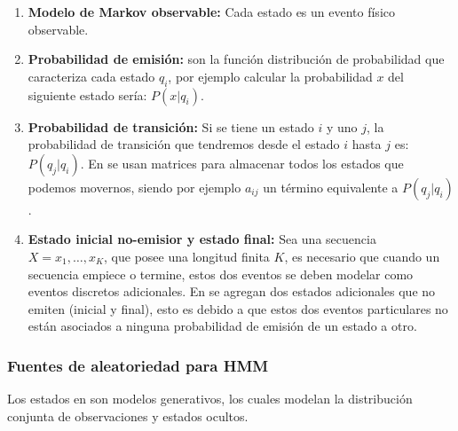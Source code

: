 \begin{enumerate}

	\item \textbf{Modelo de Markov observable:} Cada estado es un evento físico observable.

	\item \textbf{Probabilidad de emisión:} son la  función distribución de probabilidad que caracteriza cada estado $q_{i}$, por ejemplo calcular la probabilidad $x$ del siguiente estado sería: $P( x | q_{i})$.

	\item \textbf{Probabilidad de transición:} Si se tiene un estado $i$ y uno $j$, la probabilidad de transición que tendremos  desde el estado $i$ hasta $j$  es: $P(q_{j} | q_{i}  )$. En \HMM se usan matrices para almacenar todos los estados que podemos movernos, siendo por ejemplo $a_{ij}$ un término equivalente a $ P(q_{j} | q_{i}  )$.




	\item \textbf{Estado inicial no-emisior y estado final:} Sea una secuencia $X = {x_1,\dots ,x_K} $, que posee una longitud finita $K$, es necesario que cuando un secuencia empiece o termine, estos dos eventos se deben modelar como eventos discretos adicionales. En \HMM se agregan dos estados adicionales que no emiten (inicial y final), esto es debido a que estos dos eventos particulares no están asociados a ninguna probabilidad de emisión de un estado a otro.



\end{enumerate}





\subsubsection{Fuentes de aleatoriedad para HMM}

Los estados en \HMM son modelos generativos, los cuales modelan la distribución conjunta de  observaciones y estados ocultos.

